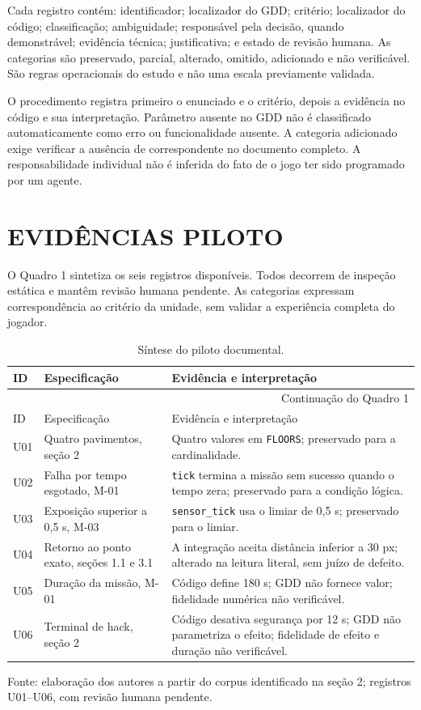 Cada registro contém: identificador; localizador do GDD; critério; localizador do código; classificação; ambiguidade; responsável pela decisão, quando demonstrável; evidência técnica; justificativa; e estado de revisão humana. As categorias são preservado, parcial, alterado, omitido, adicionado e não verificável. São regras operacionais do estudo e não uma escala previamente validada.

O procedimento registra primeiro o enunciado e o critério, depois a evidência no código e sua interpretação. Parâmetro ausente no GDD não é classificado automaticamente como erro ou funcionalidade ausente. A categoria adicionado exige verificar a ausência de correspondente no documento completo. A responsabilidade individual não é inferida do fato de o jogo ter sido programado por um agente.

\section{EVIDÊNCIAS PILOTO}
O Quadro 1 sintetiza os seis registros disponíveis. Todos decorrem de inspeção estática e mantêm revisão humana pendente. As categorias expressam correspondência ao critério da unidade, sem validar a experiência completa do jogador.

\begin{singlespace}
\begin{longtable}{|p{}|p{}|p{}|}
\caption{Síntese do piloto documental.}\\\hline
ID & Especificação & Evidência e interpretação \\\hline\endfirsthead
\multicolumn{3}{r}{\footnotesize Continuação do Quadro 1}\\\hline
ID & Especificação & Evidência e interpretação \\\hline\endhead
U01 & Quatro pavimentos, seção 2 & Quatro valores em \texttt{FLOORS}; preservado para a cardinalidade.\\\hline
U02 & Falha por tempo esgotado, M-01 & \texttt{tick} termina a missão sem sucesso quando o tempo zera; preservado para a condição lógica.\\\hline
U03 & Exposição superior a 0,5 s, M-03 & \texttt{sensor\_tick} usa o limiar de 0,5 s; preservado para o limiar.\\\hline
U04 & Retorno ao ponto exato, seções 1.1 e 3.1 & A integração aceita distância inferior a 30 px; alterado na leitura literal, sem juízo de defeito.\\\hline
U05 & Duração da missão, M-01 & Código define 180 s; GDD não fornece valor; fidelidade numérica não verificável.\\\hline
U06 & Terminal de hack, seção 2 & Código desativa segurança por 12 s; GDD não parametriza o efeito; fidelidade de efeito e duração não verificável.\\\hline
\end{longtable}
\noindent\footnotesize Fonte: elaboração dos autores a partir do corpus identificado na seção 2; registros U01--U06, com revisão humana pendente.
\end{singlespace}

